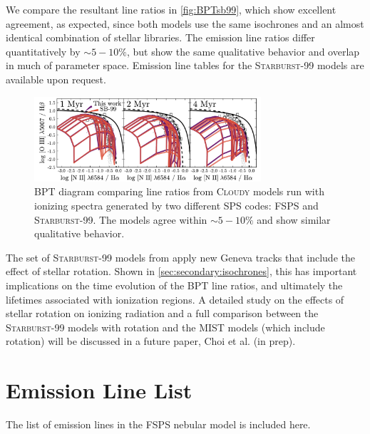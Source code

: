 \documentclass[linenumbers, tighten, trackchanges]{aastex61}%
\newcommand{\Fig}[1]{\autoref{fig:#1}}
\newcommand{\Sec}[1]{\autoref{sec:#1}}
\newcommand{\FSPS}{{\sc FSPS}\xspace}
\newcommand{\SB}{\textsc{Starburst-99}\xspace}
\newcommand{\Cloudy}{\textsc{Cloudy}\xspace}
\begin{document}
We compare the resultant line ratios in \Fig{BPTsb99}, which show excellent agreement, as expected, since both models use the same isochrones and an almost identical combination of stellar libraries. The emission line ratios differ quantitatively by $\sim5-10\%$, but show the same qualitative behavior and overlap in much of parameter space. Emission line tables for the \SB models are available upon request.

\begin{figure}[!htbp]
  \begin{centering}
    \includegraphics[width=0.75\textwidth]{f32.pdf}
    \caption{BPT diagram comparing line ratios from \Cloudy models run with ionizing spectra generated by two different SPS codes: FSPS and \SB. The models agree within $\sim5-10\%$ and show similar qualitative behavior.}
    \label{fig:BPTsb99}
  \end{centering}
\end{figure}

The set of \SB models from \citet{Levesque14} apply new Geneva tracks that include the effect of stellar rotation. Shown in \Sec{secondary:isochrones}, this has important implications on the time evolution of the BPT line ratios, and ultimately the lifetimes associated with ionization regions. A detailed study on the effects of stellar rotation on ionizing radiation and a full comparison between the \SB models with rotation and the MIST models (which include rotation) will be discussed in a future paper, Choi et al. (in prep).

\section{Emission Line List}\label{sec:appendix:lines}
The list of emission lines in the \FSPS nebular model is included here.
\end{document}
